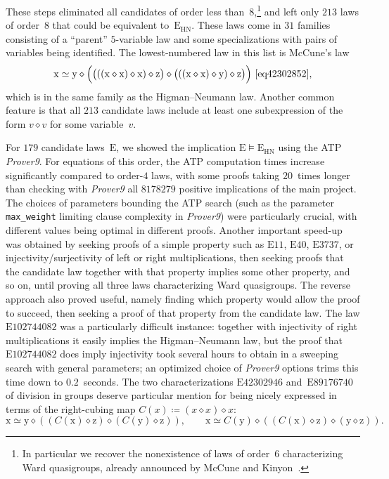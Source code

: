\documentclass[12pt]{amsart}
\theoremstyle{definition}
\newcommand{\x}{\mathrm{x}}
\newcommand{\y}{\mathrm{y}}
\newcommand{\z}{\mathrm{z}}
\newcommand{\op}{\diamond}
\newcommand{\formaleq}{\simeq}
\newcommand{\Eq}[1]{\mathrm{E}#1}
\newcommand{\E}{\mathrm{E}}
\begin{document}
These steps eliminated all candidates of order less than~$8$,\footnote{In particular we recover the nonexistence of laws of order~$6$ characterizing Ward quasigroups, already announced by McCune and Kinyon~\cite{mccune-webpage-gtsax}.} and left only $213$ laws of order~$8$ that could be equivalent to~$\E_{\mathrm{HN}}$.  These laws come in $31$ families consisting of a ``parent'' $5$-variable law and some specializations with pairs of variables being identified.  The lowest-numbered law in this list is McCune's law
\[
\x \formaleq \y \op \Bigl(\bigl(((\x \op \x) \op \x) \op \z\bigr) \op \bigl(((\x \op \x) \op \y) \op \z\bigr)\Bigr) \ \eqref{eq42302852},
\]
which is in the same family as the Higman--Neumann law.  Another common feature is that all $213$ candidate laws include at least one subexpression of the form $v \op v$ for some variable~$v$.

For $179$ candidate laws~$\E$, we showed the implication $\E\models\E_{\mathrm{HN}}$ using the ATP \emph{Prover9}.  For equations of this order, the ATP computation times increase significantly compared to order-$4$ laws, with some proofs taking $20$~times longer than checking with \emph{Prover9} all $\num{8178279}$ positive implications of the main project.  The choices of parameters bounding the ATP search (such as the parameter \texttt{max\_weight} limiting clause complexity in \emph{Prover9}) were particularly crucial, with different values being optimal in different proofs.  Another important speed-up was obtained by seeking proofs of a simple property such as $\Eq{11}$, $\Eq{40}$, $\Eq{3737}$, or injectivity/surjectivity of left or right multiplications, then seeking proofs that the candidate law together with that property implies some other property, and so on, until proving all three laws characterizing Ward quasigroups.  The reverse approach also proved useful, namely finding which property would allow the proof to succeed, then seeking a proof of that property from the candidate law.  The law $\Eq{102744082}$ was a particularly difficult instance: together with injectivity of right multiplications it easily implies the Higman--Neumann law, but the proof that $\Eq{102744082}$ does imply injectivity took several hours to obtain in a sweeping search with general parameters; an optimized choice of \emph{Prover9} options trims this time down to $0.2$~seconds.  The two characterizations $\Eq{42302946}$ and~$\Eq{89176740}$ of division in groups deserve particular mention for being nicely expressed in terms of the right-cubing map $C(x) \coloneqq (x \op x) \op x$:
\[
  \x \formaleq \y \op ((C(\x) \op \z) \op (C(\y) \op \z)), \qquad
  \x \formaleq C(\y) \op ((C(\x) \op \z) \op (\y \op \z)).
\]
\end{document}
